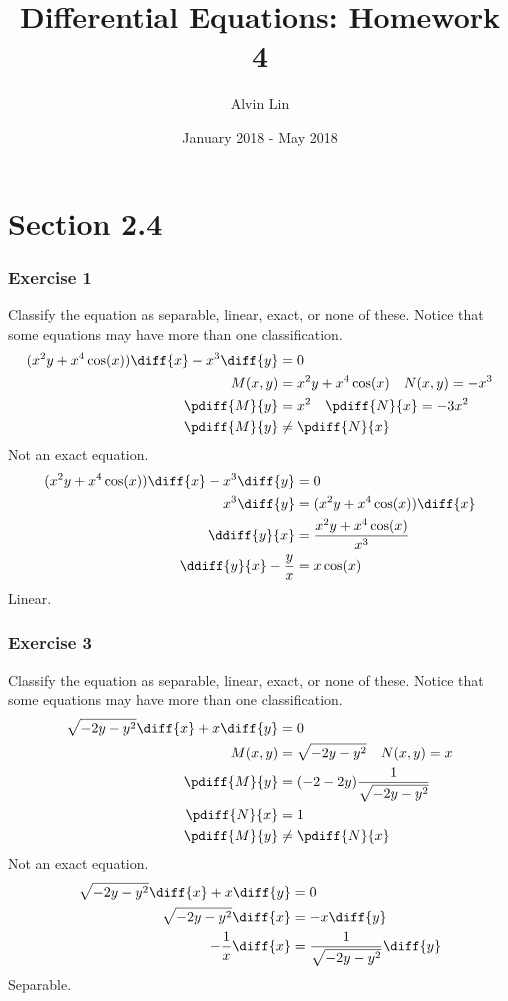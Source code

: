 \documentclass{math}
\title{Differential Equations: Homework 4}
\author{Alvin Lin}
\date{January 2018 - May 2018}
\begin{document}
\maketitle
\clearpage

\section*{Section 2.4}

\subsubsection*{Exercise 1}
Classify the equation as separable, linear, exact, or none of these. Notice that
some equations may have more than one classification.
\begin{align*}
  (x^2y+x^4\cos(x))\diff{x}-x^3\diff{y} &= 0 \\
  M(x,y) &= x^2y+x^4\cos(x) \quad N(x,y) = -x^3 \\
  \pdiff{M}{y} &= x^2 \quad \pdiff{N}{x} = -3x^2 \\
  \pdiff{M}{y} &\ne \pdiff{N}{x}
\end{align*}
Not an exact equation.
\begin{align*}
  (x^2y+x^4\cos(x))\diff{x}-x^3\diff{y} &= 0 \\
  x^3\diff{y} &= (x^2y+x^4\cos(x))\diff{x} \\
  \ddiff{y}{x} &= \frac{x^2y+x^4\cos(x)}{x^3} \\
  \ddiff{y}{x}-\frac{y}{x} &= x\cos(x)
\end{align*}
Linear.

\subsubsection*{Exercise 3}
Classify the equation as separable, linear, exact, or none of these. Notice that
some equations may have more than one classification.
\begin{align*}
  \sqrt{-2y-y^2}\diff{x}+x\diff{y} &= 0 \\
  M(x,y) &= \sqrt{-2y-y^2} \quad N(x,y) = x \\
  \pdiff{M}{y} &= (-2-2y)\frac{1}{\sqrt{-2y-y^2}} \\
  \pdiff{N}{x} &= 1 \\
  \pdiff{M}{y} &\ne \pdiff{N}{x}
\end{align*}
Not an exact equation.
\begin{align*}
  \sqrt{-2y-y^2}\diff{x}+x\diff{y} &= 0 \\
  \sqrt{-2y-y^2}\diff{x} &= -x\diff{y} \\
  -\frac{1}{x}\diff{x} &= \frac{1}{\sqrt{-2y-y^2}}\diff{y}
\end{align*}
Separable.
\end{document}
